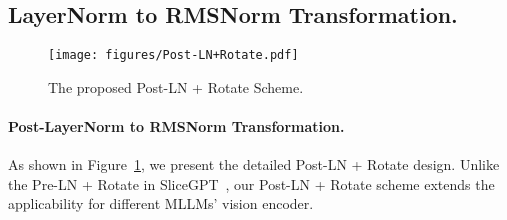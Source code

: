 \subsection{LayerNorm to RMSNorm Transformation.}
\label{pre-LN2RMSN}

\begin{figure}[h]
    \centering    
    \texttt{[image: figures/Post-LN+Rotate.pdf]}
    \vspace{-4mm}
    \caption{The proposed Post-LN + Rotate Scheme.} 
    \label{fig:post-LN+RMSNorm}
\vspace{-6mm}
\end{figure}
\paragraph{Post-LayerNorm to RMSNorm Transformation.} As shown in Figure~\ref{fig:post-LN+RMSNorm}, we present the detailed Post-LN + Rotate design. Unlike the Pre-LN + Rotate in SliceGPT~\cite{ashkboos2024slicegpt}, our Post-LN + Rotate scheme extends the applicability for different MLLMs' vision encoder.  

